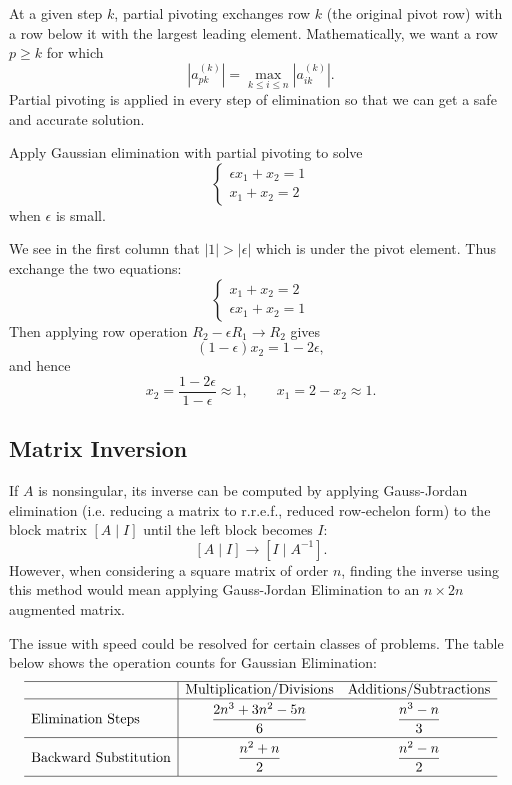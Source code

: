 \begin{definition}
At a given step $k$, partial pivoting exchanges row $k$ (the original pivot row) with a row below it with the largest leading element. Mathematically, we want a row $p\ge k$ for which
\[
 |a_{pk}^{(k)}|=
 \max_{k\le i\le n}|a_{ik}^{(k)}|.
\]
Partial pivoting is applied in every step of elimination so that we can get a safe and accurate solution.
\end{definition}

\newpage
\begin{example}
Apply Gaussian elimination with partial pivoting to solve
\[
\begin{cases}
\epsilon x_1 + x_2 = 1\\
x_1 + x_2 = 2
\end{cases}
\]
when \(\epsilon\) is small.
\end{example}

\begin{solution}[3.5cm]
We see in the first column that $|1| > |\epsilon|$ which is under the pivot element. Thus exchange the two equations:
\[
\begin{cases}
 x_1+x_2=2\\
 \epsilon x_1+x_2=1
\end{cases}
\]
Then applying row operation $R_2 - \epsilon R_1 \to R_2$ gives
\[
 (1-\epsilon)x_2=1-2\epsilon,
\]
and hence
\[
 x_2=\frac{1-2\epsilon}{1-\epsilon}\approx1,
 \qquad
 x_1=2-x_2\approx1.
\]
\end{solution}

\subsection{Matrix Inversion}
If $A$ is nonsingular, its inverse can be computed by applying Gauss-Jordan elimination (i.e. reducing a matrix to r.r.e.f., reduced row-echelon form) to the block matrix $[A\mid I]$ until the left block becomes $I$:
\[
 [A\mid I]\longrightarrow[I\mid A^{-1}].
\]
However, when considering a square matrix of order $n$, finding the inverse using this method would mean applying Gauss-Jordan Elimination to an $n \times 2n$ augmented matrix.

\medskip
The issue with speed could be resolved for certain classes of problems. The table below shows the operation counts for Gaussian Elimination:
\[
\begin{array}{l|cc}
    \hline
    & \text{Multiplication/Divisions} & \text{Additions/Subtractions}\\
    \hline
    \text{Elimination Steps}& \rule{0pt}{4.0ex}\dfrac{2n^3+3n^2-5n}{6} &\rule{0pt}{4.0ex}\dfrac{n^3-n}{3} \\[1.5ex]
    \hline
    \text{Backward Substitution}& \rule{0pt}{4.0ex}\dfrac{n^2+n}{2}&\rule{0pt}{4.0ex}\dfrac{n^2-n}{2}\\[1.5ex]
    \hline
\end{array}
\]

